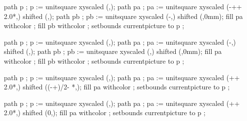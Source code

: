 
path  p  ; 
p :=  unitsquare 
      xyscaled (\overlaywidth,\overlayheight);
path  pa ; 
pa := unitsquare 
      xyscaled (\the\textwidth-+\the\rightmarginwidth+
                2.0*\the\rightmargindistance,) 
      shifted (,\overlayheight);
path  pb ; 
pb := unitsquare 
      xyscaled (\the\textwidth-,) 
      shifted (,0mm);
fill pa withcolor  ;
fill pb withcolor  ;
setbounds currentpicture to p ;
\stopuseMPgraphic



path  p  ; 
p :=  unitsquare 
      xyscaled (\overlaywidth,\overlayheight);
path pa ; 
pa := unitsquare 
      xyscaled (\the\textwidth-,) 
      shifted (,\overlayheight);
path pb ; 
pb := unitsquare 
      xyscaled (,) 
      shifted (,0mm);
fill pa withcolor  ;
fill pb withcolor  ;
setbounds currentpicture to p ;
\stopuseMPgraphic


path p ;
p :=  unitsquare 
      xyscaled (\overlaywidth,\overlayheight);
path pa ;
pa := unitsquare
      xyscaled 
      (\the\textwidth+\the\rightmarginwidth+
       2.0*\the\rightmargindistance,) 
      shifted
      ((-\the\textwidth+\overlaywidth)/2-
        \the{}*\the\rightmargindistance,\overlayheight);
fill pa withcolor  ;
setbounds currentpicture to p ;
\stopuseMPgraphic


path p ;
p := unitsquare  xyscaled (\overlaywidth,\overlayheight);
path pa ;
pa := unitsquare xyscaled 
      (\the\textwidth+\the\rightmarginwidth+
      2.0*\the\rightmargindistance,) 
      shifted
      (0,\overlayheight);
fill pa withcolor  ;
setbounds currentpicture to p ;
\stopuseMPgraphic

